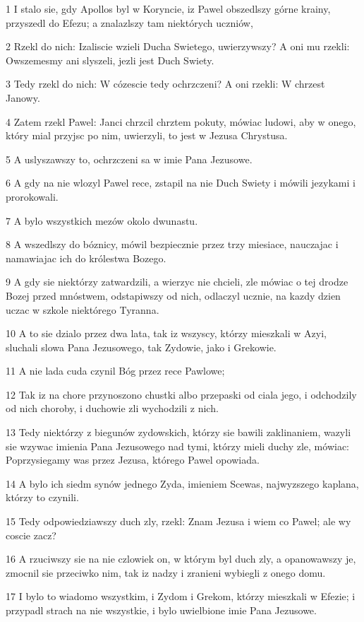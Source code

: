 \par 1 I stalo sie, gdy Apollos byl w Koryncie, iz Pawel obszedlszy górne krainy, przyszedl do Efezu; a znalazlszy tam niektórych uczniów,
\par 2 Rzekl do nich: Izaliscie wzieli Ducha Swietego, uwierzywszy? A oni mu rzekli: Owszemesmy ani slyszeli, jezli jest Duch Swiety.
\par 3 Tedy rzekl do nich: W cózescie tedy ochrzczeni? A oni rzekli: W chrzest Janowy.
\par 4 Zatem rzekl Pawel: Janci chrzcil chrztem pokuty, mówiac ludowi, aby w onego, który mial przyjsc po nim, uwierzyli, to jest w Jezusa Chrystusa.
\par 5 A uslyszawszy to, ochrzczeni sa w imie Pana Jezusowe.
\par 6 A gdy na nie wlozyl Pawel rece, zstapil na nie Duch Swiety i mówili jezykami i prorokowali.
\par 7 A bylo wszystkich mezów okolo dwunastu.
\par 8 A wszedlszy do bóznicy, mówil bezpiecznie przez trzy miesiace, nauczajac i namawiajac ich do królestwa Bozego.
\par 9 A gdy sie niektórzy zatwardzili, a wierzyc nie chcieli, zle mówiac o tej drodze Bozej przed mnóstwem, odstapiwszy od nich, odlaczyl ucznie, na kazdy dzien uczac w szkole niektórego Tyranna.
\par 10 A to sie dzialo przez dwa lata, tak iz wszyscy, którzy mieszkali w Azyi, sluchali slowa Pana Jezusowego, tak Zydowie, jako i Grekowie.
\par 11 A nie lada cuda czynil Bóg przez rece Pawlowe;
\par 12 Tak iz na chore przynoszono chustki albo przepaski od ciala jego, i odchodzily od nich choroby, i duchowie zli wychodzili z nich.
\par 13 Tedy niektórzy z biegunów zydowskich, którzy sie bawili zaklinaniem, wazyli sie wzywac imienia Pana Jezusowego nad tymi, którzy mieli duchy zle, mówiac: Poprzysiegamy was przez Jezusa, którego Pawel opowiada.
\par 14 A bylo ich siedm synów jednego Zyda, imieniem Scewas, najwyzszego kaplana, którzy to czynili.
\par 15 Tedy odpowiedziawszy duch zly, rzekl: Znam Jezusa i wiem co Pawel; ale wy coscie zacz?
\par 16 A rzuciwszy sie na nie czlowiek on, w którym byl duch zly, a opanowawszy je, zmocnil sie przeciwko nim, tak iz nadzy i zranieni wybiegli z onego domu.
\par 17 I bylo to wiadomo wszystkim, i Zydom i Grekom, którzy mieszkali w Efezie; i przypadl strach na nie wszystkie, i bylo uwielbione imie Pana Jezusowe.
